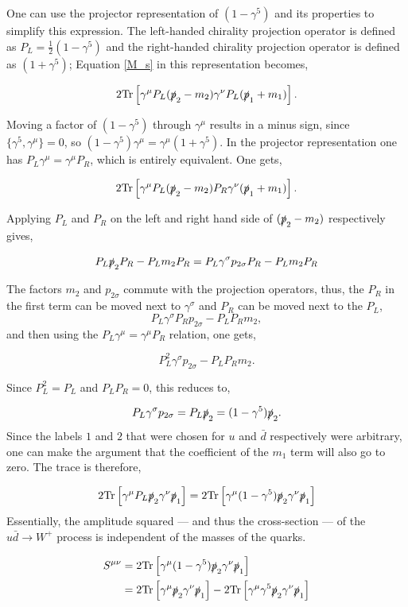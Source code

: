 \documentclass[a4paper,11pt]{article}
\begin{document}
One can use the projector representation of $(1-\gamma^5)$ and its properties to simplify this expression. The left-handed chirality projection operator is defined as $P_L = \frac{1}{2}(1-\gamma^5)$ and the right-handed chirality projection operator is defined as $(1+\gamma^5)$; Equation \ref{M_s} in this representation becomes,

$$2\text{Tr}\left[\gamma^\mu P_L (\slashed{p}_2-m_2)\gamma^\nu P_L (\slashed{p}_1+m_1) \right].$$ 

 Moving a factor of $(1- \gamma^5)$ through $\gamma^\mu$ results in a minus sign, since $\{\gamma^5, \gamma^\mu\}=0$, so $(1 - \gamma^5)\gamma^\mu = \gamma^\mu(1+ \gamma^5)$. In the projector representation one has $P_L \gamma^\mu =\gamma^\mu P_R$, which is entirely equivalent. One gets,
 
 $$2\text{Tr}\left[\gamma^\mu P_L (\slashed{p}_2-m_2)P_R\gamma^\nu(\slashed{p}_1+m_1) \right].$$ 

Applying $P_L$ and $P_R$ on the left and right hand side of $(\slashed{p}_2-m_2)$ respectively gives,

$$P_L\slashed{p}_2 P_R - P_L m_2 P_R = P_L \gamma^\sigma p_{2\sigma} P_R - P_L m_2 P_R $$

The factors $m_2$ and $p_{2\sigma}$ commute with the projection operators, thus, the $P_R$ in the first term can be moved next to $\gamma^\sigma$ and $P_R$ can be moved next to the $P_L$,
$$P_L \gamma^\sigma P_R p_{2\sigma} - P_LP_R m_2,$$ 
and then using the $P_L \gamma^\mu =\gamma^\mu P_R$ relation, one gets,

$$P_L^2 \gamma^\sigma p_{2\sigma} - P_LP_R m_2.$$

Since $P_L^2 = P_L$ and $P_LP_R=0$, this reduces to,

$$P_L \gamma^\sigma p_{2\sigma} = P_L \slashed{p}_2 = (1-\gamma^5)\slashed{p}_2.$$
Since the labels $1$ and $2$ that were chosen for $u$ and $\bar{d}$ respectively were arbitrary, one can make the argument that the coefficient of the $m_1$ term will also go to zero. The trace is therefore,

 $$2\text{Tr}\left[\gamma^\mu P_L \slashed{p}_2\gamma^\nu\slashed{p}_1 \right]= 2\text{Tr}\left[\gamma^\mu (1-\gamma^5) \slashed{p}_2\gamma^\nu\slashed{p}_1\right] $$ 
Essentially, the amplitude squared --- and thus the cross-section --- of the $u \bar{d} \rightarrow W^+$ process is independent of the masses of the quarks.


\begin{equation}\label{traces1}
	\begin{aligned}
		S^{\mu\nu} &= 2\text{Tr}\left[\gamma^\mu (1-\gamma^5)\slashed{p}_2\gamma^\nu \slashed{p}_1\right] \\
		&=  2\text{Tr}\left[\gamma^\mu \slashed{p}_2\gamma^\nu \slashed{p}_1 \right] - 2\text{Tr}\left[ \gamma^\mu \gamma^5 \slashed{p}_2\gamma^\nu \slashed{p}_1 \right]
	\end{aligned}
\end{equation}
\end{document}
